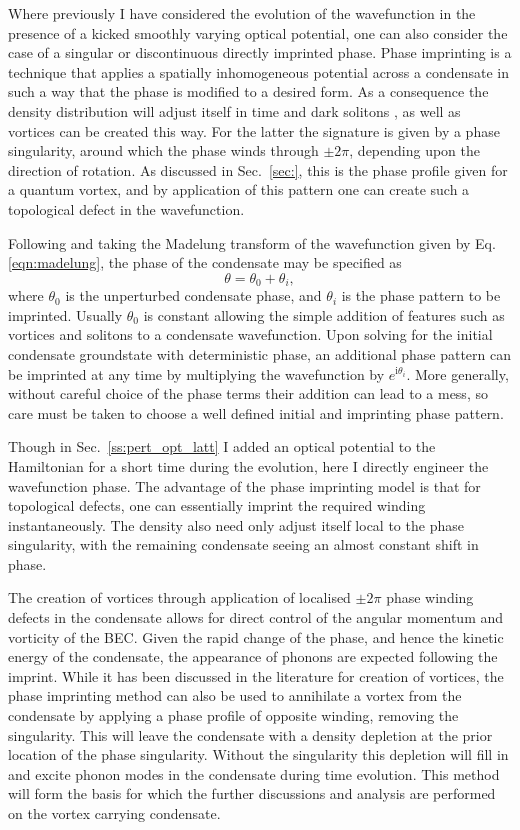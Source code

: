 Where previously I have considered the evolution of the wavefunction in the presence of a kicked smoothly varying optical potential, one can also consider the case of a singular or discontinuous directly imprinted phase. Phase imprinting is a technique that applies a spatially inhomogeneous potential across a condensate in such a way that the phase is modified to a desired form. As a consequence the density distribution will adjust itself in time and dark solitons \cite{BEC:Denschlag_science_2000}, as well as vortices \cite{Vtx:Dobrek_pra_1999} can be created this way. For the latter the signature is given by a phase singularity, around which the phase winds through $\pm 2\pi$, depending upon the direction of rotation. As discussed in Sec.~\ref{sec:}, this is the phase profile given for a quantum vortex, and by application of this pattern one can create such a topological defect in the wavefunction.

Following \cite{BK:Pitaevskii_Stringari_2003} and taking the Madelung transform of the wavefunction given by Eq. \eqref{eqn:madelung}, the phase of the condensate may be specified as
\begin{equation}
\theta = \theta_0 + \theta_i,
\end{equation}
where $\theta_0$ is the unperturbed condensate phase, and $\theta_i$ is the phase pattern to be imprinted. Usually $\theta_0$ is constant allowing the simple addition of features such as vortices and solitons to a condensate wavefunction. Upon solving for the initial condensate groundstate with deterministic phase, an additional phase pattern can be imprinted at any time by multiplying the wavefunction by $e^{\text{i}\theta_i}$. More generally, without careful choice of the phase terms their addition can lead to a mess, so care must be taken to choose a well defined initial and imprinting phase pattern.

Though in Sec.~\ref{ss:pert_opt_latt} I added an optical potential to the Hamiltonian for a short time during the evolution, here I directly engineer the wavefunction phase. The advantage of the phase imprinting model is that for topological defects, one can essentially imprint the required winding instantaneously. The density also need only adjust itself local to the phase singularity, with the remaining condensate seeing an almost constant shift in phase.

The creation of vortices through application of localised $\pm 2\pi$ phase winding defects in the condensate allows for direct control of the angular momentum and vorticity of the BEC. Given the rapid change of the phase, and hence the kinetic energy of the condensate, the appearance of phonons are expected following the imprint. While it has been discussed in the literature for creation of vortices, the phase imprinting method can also be used to annihilate a vortex from the condensate by applying a phase profile of opposite winding, removing the singularity. This will leave the condensate with a density depletion at the prior location of the phase singularity. Without the singularity this depletion will fill in and excite phonon modes in the condensate during time evolution. This method will form the basis for which the further discussions and analysis are performed on the vortex carrying condensate.

